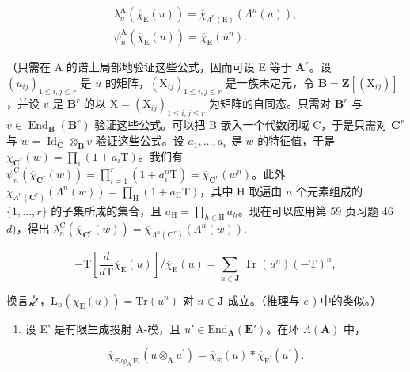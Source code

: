 \[
\begin{array}{l} \lambda_ {n} ^ {\mathrm{A}} (\overline {{\chi}} _ {\mathrm{E}} (u)) = \overline {{\chi}} _ {\Lambda^ {n} (\mathrm{E})} (\Lambda^ {n} (u)), \\ \psi_ {n} ^ {\mathrm{A}} (\overline {{\chi}} _ {\mathrm{E}} (u)) = \overline {{\chi}} _ {\mathrm{E}} (u ^ {n}). \end{array}
\]

（只需在 A 的谱上局部地验证这些公式，因而可设 E 等于 \(\mathbf{A}^r\)。设 \((u_{ij})_{1\leqslant i,j\leqslant r}\) 是 \(u\) 的矩阵，\((\mathrm{X}_{ij})_{1\leqslant i,j\leqslant r}\) 是一族未定元，令 \(\mathbf{B} = \mathbf{Z}[(\mathrm{X}_{ij})]\)，并设 \(v\) 是 \(\mathbf{B}^r\) 的以 \(\mathrm{X} = (\mathrm{X}_{ij})_{1\leqslant i,j\leqslant r}\) 为矩阵的自同态。只需对 \(\mathbf{B}^r\) 与 \(v\in \operatorname {End}_{\mathbf{B}}(\mathbf{B}^r)\) 验证这些公式。可以把 B 嵌入一个代数闭域 C，于是只需对 \(\mathbf{C}^r\) 与 \(w = \operatorname {Id}_{\mathbf{C}}\otimes_{\mathbf{B}}v\) 验证这些公式。设 \(a_1,\dots,a_r\) 是 \(w\) 的特征值，于是 \(\overline{\chi}_{\mathbf{C}^r}(w) = \prod_i(1 + a_i\mathrm{T})\)。我们有 \(\psi_n^{\mathrm{C}}(\overline{\chi}_{\mathbf{C}^r}(w)) = \prod_{i = 1}^{r}(1 + a_i^n\mathrm{T}) = \overline{\chi}_{\mathbf{C}^r}(w^n)\)。此外 \(\chi_{\Lambda^n (\mathbf{C}^r)}(\Lambda^n (w)) = \prod_{\mathrm{H}}(1 + a_{\mathrm{H}}\mathrm{T})\)，其中 H 取遍由 \(n\) 个元素组成的 \(\{1,\dots,r\}\) 的子集所成的集合，且 \(a_{\mathrm{H}} = \prod_{h\in \mathrm{H}}a_h\)。现在可以应用第 59 页习题 46 \(d)\)，得出 \(\lambda_n^{\mathrm{C}}(\overline{\chi}_{\mathbf{C}^r}(w)) = \overline{\chi}_{\Lambda^{n}(\mathbf{C}^{r})}(\Lambda^{n}(w)).\)

\[
- \mathrm{T} \left[ \frac {d}{d \mathrm{T}} \overline {{{\chi}}} _ {\mathrm{E}} (u) \right] / \overline {{{\chi}}} _ {\mathrm{E}} (u) = \sum_ {n \in \mathbf {J}} \operatorname{Tr} (u ^ {n}) (- \mathrm{T}) ^ {n},
\]

换言之，\(\mathrm{L}_n(\overline{\chi}_{\mathrm{E}}(u)) = \mathrm{Tr}(u^n)\) 对 \(n \in \mathbf{J}\) 成立。（推理与 \(e\) ) 中的类似。）

\begin{enumerate}
\def\labelenumi{\alph{enumi})}
\setcounter{enumi}{6}
\tightlist
\item
  设 E' 是有限生成投射 A-模，且 \(u' \in \mathrm{End}_{\mathbf{A}}(\mathbf{E}')\)。在环 \(\Lambda(\mathbf{A})\) 中，
\end{enumerate}

\[
\overline {{{{\chi}}}} _ {\mathrm{E} \otimes_ {\mathrm{A}} \mathrm{E} ^ {\prime}} (u \otimes_ {\mathrm{A}} u ^ {\prime}) = \overline {{{{\chi}}}} _ {\mathrm{E}} (u) * \overline {{{{\chi}}}} _ {\mathrm{E} ^ {\prime}} (u ^ {\prime}).
\]

